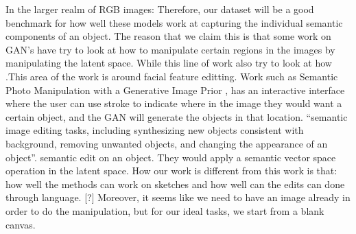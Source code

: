 In the larger realm of RGB images:
Therefore, our dataset will be a good benchmark for how well these models work at capturing the individual semantic components of an object. The reason that we claim this is that some work on GAN's have try to look at how to manipulate certain regions in the images by manipulating the latent space. While this line of work also try to look at how .This area of the work is around facial feature editting. Work such as Semantic Photo Manipulation with a Generative Image Prior \citep{Bau:Ganpaint:2019}, has an interactive interface where the user can use stroke to indicate where in the image they would want a certain object, and the GAN will generate the objects in that location. ``semantic image editing tasks, including synthesizing new objects consistent with background, removing unwanted objects, and changing the appearance of an object''. semantic edit on an object. They would apply a semantic vector space operation in the latent space. How our work is different from this work is that: how well the methods can work on sketches and how well can the edits can done through language. [?] Moreover, it seems like we need to have an image already in order to do the manipulation, but for our ideal tasks, we start from a blank canvas.

